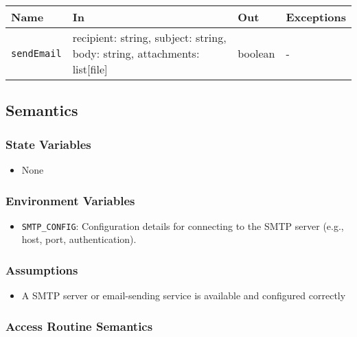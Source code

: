 \documentclass[12pt, titlepage]{article}
\begin{document}
\begin{center}
\begin{tabular}{p{5cm} p{3.5cm} p{3.5cm} p{2cm}}
\hline
\textbf{Name} & \textbf{In} & \textbf{Out} & \textbf{Exceptions} \\
\hline
\texttt{sendEmail} & recipient: string, subject: string, body: string, attachments: list[file] & boolean & - \\
\hline
\end{tabular}
\end{center}

\subsection{Semantics}

\subsubsection{State Variables}

\begin{itemize}
    \item None
\end{itemize}

\subsubsection{Environment Variables}

\begin{itemize}
    \item \texttt{SMTP\_CONFIG}: Configuration details for connecting to the SMTP server (e.g., host, port, authentication).
\end{itemize}

\subsubsection{Assumptions}

\begin{itemize}
    \item A SMTP server or email-sending service is available and configured correctly
\end{itemize}

\subsubsection{Access Routine Semantics}
\end{document}

